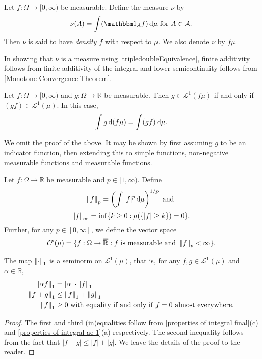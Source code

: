 \begin{definition}
    Let $f:\Omega\to[0,\infty)$ be measurable. Define the measure $\nu$ by
    $$\nu(A)=\int (\indic_A f)\d\mu\text{ for }A\in\mathcal{A}.$$
    Then $\nu$ is said to have \textit{density $f$} with respect to $\mu$. We also denote $\nu$ by $f\mu$.
\end{definition}

In showing that $\nu$ is a measure using \cref{tripledoubleEquivalence}, finite additivity follows from finite additivity of the integral and lower semicontinuity follows from \cref{Monotone Convergence Theorem}.

\begin{theorem}
    Let $f:\Omega\to[0,\infty)$ and $g:\Omega\to\overline{\mathbb{R}}$ be measurable. Then $g\in\mathcal{L}^1(f\mu)$ if and only if $(gf)\in\mathcal{L}^1(\mu)$. In this case, $$\int g\operatorname{d}\!{(f\mu)} = \int (gf)\operatorname{d}\!{\mu}.$$
\end{theorem}
We omit the proof of the above. It may be shown by first assuming $g$ to be an indicator function, then extending this to simple functions, non-negative measurable functions and measurable functions.

\begin{definition}
    Let $f:\Omega\to\overline{\mathbb{R}}$ be measurable and $p\in[1,\infty)$. Define
    $$\left\lVert f\right\rVert_p=\left(\int |f|^p\operatorname{d}\!{\mu}\right)^{1/p}\text{ and }$$
    $$\left\lVert f\right\rVert_\infty=\inf \{k\geq 0:\mu(\{|f|\geq k\})=0\}.$$
    Further, for any $p\in[0,\infty]$, we define the vector space
    $$\mathcal{L}^p(\mu) = \{f:\Omega\to\overline{\mathbb{R}} : f\text{ is measurable and }\left\lVert f\right\rVert_p<\infty\}.$$
\end{definition}

\begin{theorem}
    The map $\left\lVert\cdot\right\rVert_1$ is a seminorm on $\mathcal{L}^1(\mu)$, that is, for any $f,g\in\mathcal{L}^1(\mu)$ and $\alpha\in\mathbb{R}$,
    \begin{align*}
        \left\lVert\alpha f\right\rVert_1 &= |\alpha|\cdot\left\lVert f\right\rVert_1 \\
        \left\lVert f+g\right\rVert_1 &\leq \left\lVert f\right\rVert_1 + \left\lVert g\right\rVert_1 \\
        \left\lVert f\right\rVert_1 &\geq 0\text{ with equality if and only if }f=0\text{ almost everywhere.}
    \end{align*}
\end{theorem}
\begin{proof}
    The first and third (in)equalities follow from \cref{properties of integral final}(c) and \cref{properties of integral ae 1}(a) respectively. The second inequality follows from the fact that $|f+g|\leq |f|+|g|$. We leave the details of the proof to the reader.
\end{proof}

